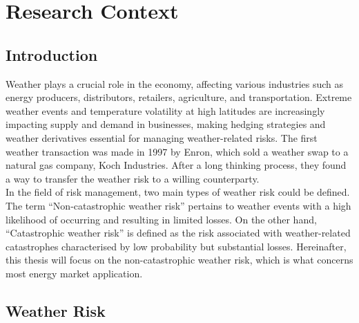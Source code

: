 %

\chapter{Research Context}
\label{ch:weather_derivatives}

\glsresetall

\section{Introduction}
\label{sec:weather_intro}

    Weather plays a crucial role in the economy, affecting various industries such as energy producers,
    distributors, retailers, agriculture, and transportation.
    Extreme weather events and temperature volatility at high latitudes are increasingly impacting supply and demand
    in businesses, making hedging strategies and weather derivatives essential for managing weather-related risks.
    The first weather transaction was made in 1997 by Enron,
    which sold a weather swap to a natural gas company, Koch Industries.
    After a long thinking process,
    they found a way to transfer the weather risk to a willing counterparty\cite{barrieu_primer_2010}.\\

    In the field of risk management, two main types of weather risk could be defined\cite{leggio_using_2007}.
    The term ``Non-catastrophic weather risk'' pertains to weather events with a high likelihood
    of occurring and resulting in limited losses.
    On the other hand, ``Catastrophic weather risk'' is defined as the risk associated with weather-related catastrophes
    characterised by low probability but substantial losses.
    Hereinafter, this thesis will focus on the non-catastrophic weather risk,
    which is what concerns most energy market application.


\section{Weather Risk}
\label{sec:weather_risk}

